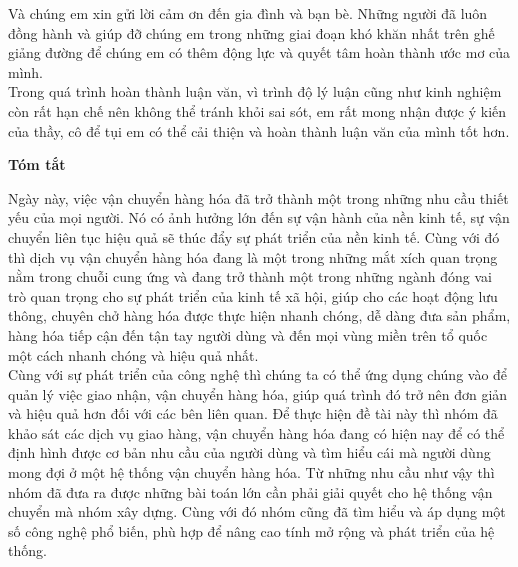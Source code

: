 	Và chúng em xin gửi lời cảm ơn đến gia đình và bạn bè. Những người đã luôn đồng hành và giúp đỡ chúng em trong những giai đoạn khó khăn nhất trên ghế giảng đường để chúng em có thêm động lực và quyết tâm hoàn thành ước mơ của mình.\\
	
	Trong quá trình hoàn thành luận văn, vì trình độ lý luận cũng như kinh nghiệm còn rất hạn chế nên không thể tránh khỏi sai sót, em rất mong nhận được ý kiến của thầy, cô để tụi em có thể cải thiện và hoàn thành luận văn của mình tốt hơn.\\

\newpage
\thispagestyle{plain}
\begin{center}
    \Large
    \textbf{Tóm tắt}
    \vspace{1cm}
\end{center}

Ngày này, việc vận chuyển hàng hóa đã trở thành một trong những nhu cầu thiết yếu của mọi người. Nó có ảnh hưởng lớn đến sự vận hành của nền kinh tế, sự vận chuyển liên tục hiệu quả sẽ thúc đẩy sự phát triển của nền kinh tế. Cùng với đó thì dịch vụ vận chuyển hàng hóa đang là một trong những mắt xích quan trọng nằm trong chuỗi cung ứng và đang trở thành một trong những ngành đóng vai trò quan trọng cho sự phát triển của kinh tế xã hội, giúp cho các hoạt động lưu thông, chuyên chở hàng hóa được thực hiện nhanh chóng, dễ dàng đưa sản phẩm, hàng hóa tiếp cận đến tận tay người dùng và đến mọi vùng miền trên tổ quốc một cách nhanh chóng và hiệu quả nhất.\\

Cùng với sự phát triển của công nghệ thì chúng ta có thể ứng dụng chúng vào để quản lý việc giao nhận, vận chuyển hàng hóa, giúp quá trình đó trở nên đơn giản và hiệu quả hơn đối với các bên liên quan. Để thực hiện đề tài này thì nhóm đã khảo sát các dịch vụ giao hàng, vận chuyển hàng hóa đang có hiện nay để có thể định hình được cơ bản nhu cầu của người dùng và tìm hiểu cái mà người dùng mong đợi ở một hệ thống vận chuyển hàng hóa. Từ những nhu cầu như vậy thì nhóm đã đưa ra được những bài toán lớn cần phải giải quyết cho hệ thống vận chuyển mà nhóm xây dựng. Cùng với đó nhóm cũng đã tìm hiểu và áp dụng một số công nghệ phổ biến, phù hợp để nâng cao tính mở rộng và phát triển của hệ thống.\\
